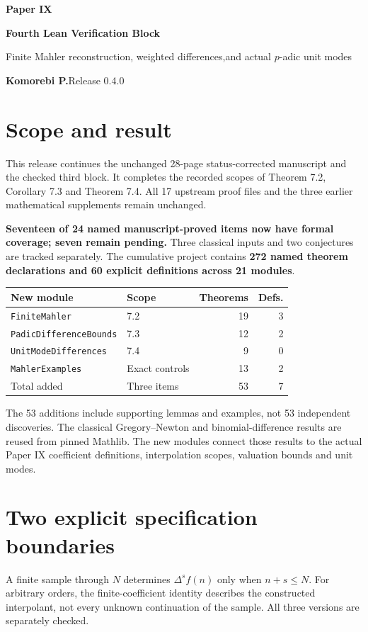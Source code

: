 \documentclass[11pt]{article}
\begin{document}
{\LARGE\bfseries\color{ink}Paper IX}\par
{\Large\bfseries Fourth Lean Verification Block}\par
{\large Finite Mahler reconstruction, weighted differences,\newline and actual $p$-adic unit modes}\par
\textbf{Komorebi P.}\hfill Release 0.4.0
\bigskip
\section*{Scope and result}
This release continues the unchanged 28-page status-corrected manuscript and the checked third block. It completes the recorded scopes of Theorem 7.2, Corollary 7.3 and Theorem 7.4. All 17 upstream proof files and the three earlier mathematical supplements remain unchanged.

\textbf{Seventeen of 24 named manuscript-proved items now have formal coverage; seven remain pending.} Three classical inputs and two conjectures are tracked separately. The cumulative project contains \textbf{272 named theorem declarations and 60 explicit definitions across 21 modules}.

\begin{center}
\begin{tabular}{@{}p{}p{}rr@{}}
\toprule
New module & Scope & Theorems & Defs.\\\midrule
\texttt{FiniteMahler} & 7.2 & 19 & 3\\
\texttt{PadicDifferenceBounds} & 7.3 & 12 & 2\\
\texttt{UnitModeDifferences} & 7.4 & 9 & 0\\
\texttt{MahlerExamples} & Exact controls & 13 & 2\\\midrule
Total added & Three items & 53 & 7\\\bottomrule
\end{tabular}
\end{center}
The 53 additions include supporting lemmas and examples, not 53 independent discoveries. The classical Gregory--Newton and binomial-difference results are reused from pinned Mathlib. The new modules connect those results to the actual Paper IX coefficient definitions, interpolation scopes, valuation bounds and unit modes.

\section*{Two explicit specification boundaries}
A finite sample through $N$ determines $\Delta^s f(n)$ only when $n+s\leq N$. For arbitrary orders, the finite-coefficient identity describes the constructed interpolant, not every unknown continuation of the sample. All three versions are separately checked.
\end{document}
